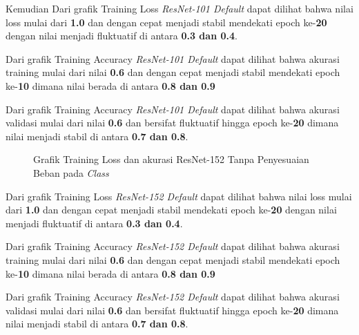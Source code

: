 Kemudian Dari grafik Training Loss \emph{ResNet-101 Default} dapat dilihat bahwa nilai loss mulai dari \textbf{1.0} dan dengan cepat menjadi stabil mendekati epoch ke-\textbf{20} dengan nilai menjadi fluktuatif di antara \textbf{0.3 dan 0.4}.

Dari grafik Training Accuracy \emph{ResNet-101 Default} dapat dilihat bahwa akurasi training mulai dari nilai \textbf{0.6} dan dengan cepat menjadi stabil mendekati epoch ke-\textbf{10} dimana nilai berada di antara \textbf{0.8 dan 0.9} 

Dari grafik Training Accuracy \emph{ResNet-101 Default} dapat dilihat bahwa akurasi validasi mulai dari nilai \textbf{0.6} dan bersifat fluktuatif hingga epoch ke-\textbf{20} dimana nilai menjadi stabil di antara \textbf{0.7 dan 0.8}.

\begin{figure}[hbtp]
	\caption{Grafik Training Loss dan akurasi ResNet-152 Tanpa Penyesuaian Beban pada \emph{Class}}
	\label{Fig:GraphTrainingDefPt3}
\end{figure}
Dari grafik Training Loss \emph{ResNet-152 Default} dapat dilihat bahwa nilai loss mulai dari \textbf{1.0} dan dengan cepat menjadi stabil mendekati epoch ke-\textbf{20} dengan nilai menjadi fluktuatif di antara \textbf{0.3 dan 0.4}.

Dari grafik Training Accuracy \emph{ResNet-152 Default} dapat dilihat bahwa akurasi training mulai dari nilai \textbf{0.6} dan dengan cepat menjadi stabil mendekati epoch ke-\textbf{10} dimana nilai berada di antara \textbf{0.8 dan 0.9} 

Dari grafik Training Accuracy \emph{ResNet-152 Default} dapat dilihat bahwa akurasi validasi mulai dari nilai \textbf{0.6} dan bersifat fluktuatif hingga epoch ke-\textbf{20} dimana nilai menjadi stabil di antara \textbf{0.7 dan 0.8}.

